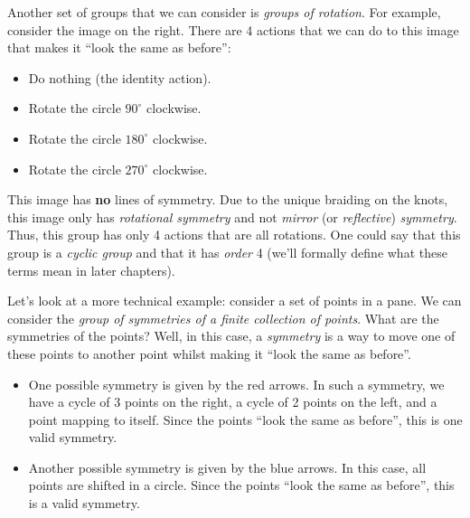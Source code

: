 Another set of groups that we can consider is \textit{groups of rotation}. For example, consider the image on the right. There are 4 actions that we can do to this image that makes it ``look the same as before'':
\begin{itemize}
    \item Do nothing (the identity action).
    \item Rotate the circle $90^\circ$ clockwise.
    \item Rotate the circle $180^\circ$ clockwise.
    \item Rotate the circle $270^\circ$ clockwise.
\end{itemize}
This image has \textbf{no} lines of symmetry. Due to the unique braiding on the knots, this image only has \textit{rotational symmetry} and not \textit{mirror} (or \textit{reflective}) \textit{symmetry}. Thus, this group has only 4 actions that are all rotations. One could say that this group is a \textit{cyclic group} and that it has \textit{order} 4 (we’ll formally define what these terms mean in later chapters).

\begin{figure}
    \centering
\end{figure}

Let’s look at a more technical example: consider a set of points in a pane. We can consider the \textit{group of symmetries of a finite collection of points}. What are the symmetries of the points? Well, in this case, a \textit{symmetry} is a way to move one of these points to another point whilst making it ``look the same as before''.

\begin{itemize}
    \item One possible symmetry is given by the red arrows. In such a symmetry, we have a cycle of 3 points on the right, a cycle of 2 points on the left, and a point mapping to itself. Since the points ``look the same as before'', this is one valid symmetry.
    \item Another possible symmetry is given by the blue arrows. In this case, all points are shifted in a circle. Since the points ``look the same as before'', this is a valid symmetry.
\end{itemize}

